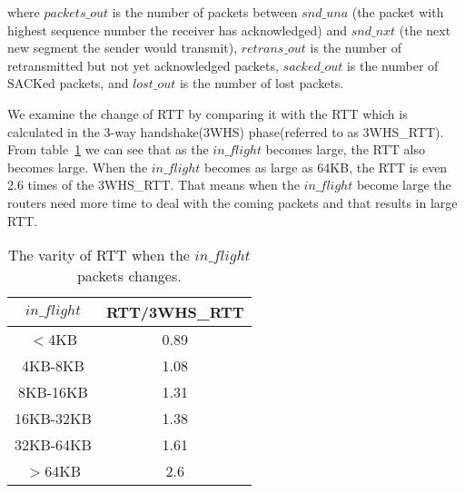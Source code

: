 where $packets\_out$ is the number of packets between $snd\_una$ (the packet with highest sequence number the receiver has acknowledged) and $snd\_nxt$ (the next new segment the sender would transmit), $retrans\_out$ is the number of retransmitted but not yet acknowledged packets, $sacked\_out$ is the number of SACKed packets, and $lost\_out$ is the number of lost packets.

We examine the change of RTT by comparing it with the RTT which is calculated in the 3-way handshake(3WHS) phase(referred to as 3WHS\_RTT). From table~\ref{tbl:inflight-rtt} we can see that as the $in\_flight$ becomes large, the RTT also becomes large. When the $in\_flight$ becomes as large as 64KB, the RTT is even 2.6 times of the 3WHS\_RTT. That means when the $in\_flight$ become large the routers need more time to deal with the coming packets and that results in large RTT.      

\begin{table}[ht]
\tablefontsize
\renewcommand{\arraystretch}{\assize}
 \setlength{\tabcolsep}{3pt}
\caption{The varity of RTT when the $in\_flight$ packets changes.}
\centering
\begin{tabular}{c|c}
	\toprule
	 $in\_flight$ & RTT/3WHS\_RTT \\
	\hline
	$<$4KB & 0.89 \\
	\hline
	4KB-8KB & 1.08  \\
	\hline
	8KB-16KB & 1.31  \\
	\hline
	16KB-32KB & 1.38  \\
	\hline
	32KB-64KB & 1.61 \\
	\hline
	$>$64KB & 2.6  \\
	\bottomrule
\end{tabular}
\label{tbl:inflight-rtt}
\termspace
\end{table}  




